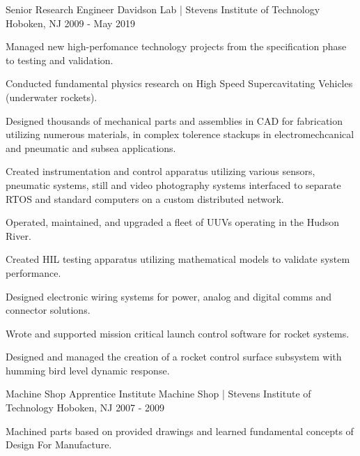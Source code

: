 \begin{cventries}
  \cventry
    {Senior Research Engineer} %
    {Davidson Lab | Stevens Institute of Technology} %
    {Hoboken, NJ} %
    {2009 - May 2019} %
    {
      \begin{cvitems} %
        \item {Managed new high-perfomance technology projects from the specification phase to testing and validation.} 
        \item {Conducted fundamental physics research on High Speed Supercavitating Vehicles (underwater rockets).}
        \item {Designed thousands of mechanical parts and assemblies in CAD for fabrication utilizing numerous materials, in complex tolerence stackups in electromechcanical and pneumatic and subsea applications.}
        \item {Created instrumentation and control apparatus utilizing various sensors, pneumatic systems, still and video photography systems interfaced to separate RTOS and standard computers on a custom distributed network.} 
        \item {Operated, maintained, and upgraded a fleet of UUVs operating in the Hudson River.}
        \item {Created HIL testing apparatus utilizing mathematical models to validate system performance.} 
        \item {Designed electronic wiring systems for power, analog and digital comms and connector solutions.}
        \item {Wrote and supported mission critical launch control software for rocket systems.} 
        \item {Designed and managed the creation of a rocket control surface subsystem with humming bird level dynamic response.}
      \end{cvitems}
    }


  \cventry
    {Machine Shop Apprentice} %
    {Institute Machine Shop | Stevens Institute of Technology} %
    {Hoboken, NJ} %
    {2007 - 2009} %
    {%
      \begin{cvitems} %
        \item {Machined parts based on provided drawings and learned fundamental concepts of Design For Manufacture.}
      \end{cvitems}
    }

\end{cventries}
